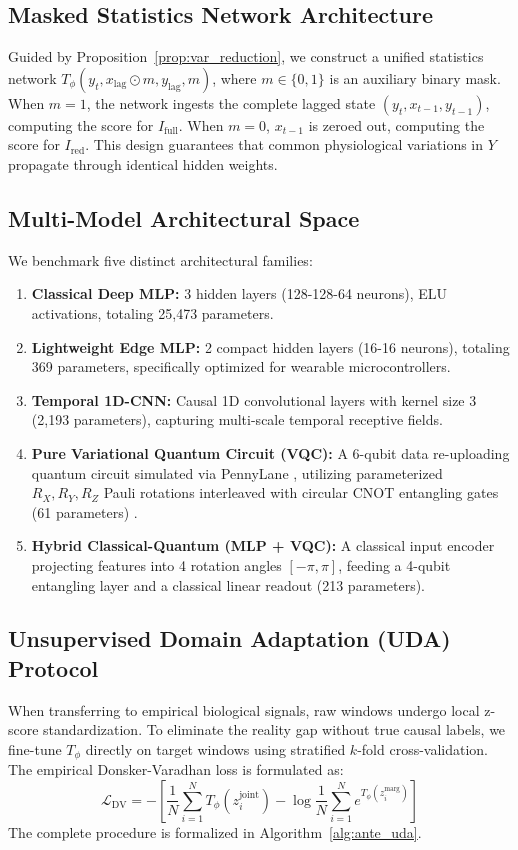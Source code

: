 \subsection{Masked Statistics Network Architecture}
Guided by Proposition~\ref{prop:var_reduction}, we construct a unified statistics network $T_\phi(y_t, x_{\text{lag}} \odot m, y_{\text{lag}}, m)$, where $m \in \{0, 1\}$ is an auxiliary binary mask. 
When $m = 1$, the network ingests the complete lagged state $(y_t, x_{t-1}, y_{t-1})$, computing the score for $I_{\text{full}}$. When $m = 0$, $x_{t-1}$ is zeroed out, computing the score for $I_{\text{red}}$. This design guarantees that common physiological variations in $Y$ propagate through identical hidden weights.

\subsection{Multi-Model Architectural Space}
We benchmark five distinct architectural families:
\begin{enumerate}
    \item \textbf{Classical Deep MLP:} 3 hidden layers (128-128-64 neurons), ELU activations, totaling 25,473 parameters.
    \item \textbf{Lightweight Edge MLP:} 2 compact hidden layers (16-16 neurons), totaling 369 parameters, specifically optimized for wearable microcontrollers.
    \item \textbf{Temporal 1D-CNN:} Causal 1D convolutional layers with kernel size 3 (2,193 parameters), capturing multi-scale temporal receptive fields.
    \item \textbf{Pure Variational Quantum Circuit (VQC):} A 6-qubit data re-uploading quantum circuit simulated via PennyLane \cite{bergholm2018pennylane}, utilizing parameterized $R_X, R_Y, R_Z$ Pauli rotations interleaved with circular CNOT entangling gates (61 parameters) \cite{perez2020data}.
    \item \textbf{Hybrid Classical-Quantum (MLP + VQC):} A classical input encoder projecting features into 4 rotation angles $[-\pi, \pi]$, feeding a 4-qubit entangling layer and a classical linear readout (213 parameters).
\end{enumerate}

\subsection{Unsupervised Domain Adaptation (UDA) Protocol}
When transferring to empirical biological signals, raw windows undergo local z-score standardization. To eliminate the reality gap without true causal labels, we fine-tune $T_\phi$ directly on target windows using stratified $k$-fold cross-validation. The empirical Donsker-Varadhan loss is formulated as:
\begin{equation}
\label{eq:dv_loss_func}
\mathcal{L}_{\text{DV}} = -\left[ \frac{1}{N}\sum_{i=1}^N T_\phi(z_i^{\text{joint}}) - \log \frac{1}{N}\sum_{i=1}^N e^{T_\phi(z_i^{\text{marg}})} \right]
\end{equation}
The complete procedure is formalized in Algorithm~\ref{alg:ante_uda}.

